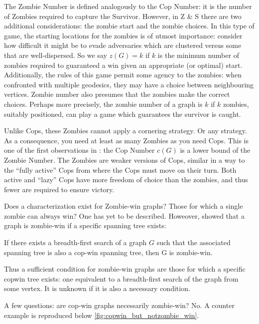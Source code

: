 The Zombie Number is defined analogously to the Cop Number: it is the number of Zombies
required to capture the Survivor. However, in Z \& S there are two additional considerations:
the zombie start and the zombie choices.
In this type of game, the starting locations for the zombies is of utmost importance:
consider how difficult it might be to evade adversaries which are clustered versus some
that are well-dispersed. So we say $z(G) = k$ if $k$ is the minimum number of
zombies required to guaranteed a win
given an appropriate (or optimal) start. Additionally, the rules of this game permit
some agency to the zombies: when confronted with multiple geodesics, they may have
a choice between neighbouring vertices. Zombie number also presumes that
the zombies make the correct choices. Perhaps more precisely, the zombie number of a
graph is $k$ if $k$ zombies, suitably positioned, can play a game which guarantees the survivor
is caught.

Unlike Cops, these Zombies cannot apply a cornering strategy. Or any strategy.
As a consequence, you need at least as many Zombies as you need Cops.
This is one of the first observations
in \cite{fitzpatrick2016deterministic}: the Cop Number $c(G)$ is a lower bound of the Zombie Number. The Zombies are weaker versions of Cops, similar in a way to the ``fully active'' Cops from \cite{gromovikov2018fully} where the Cops must move on their turn. Both
active and ``lazy'' Cops have more freedom of choice than the zombies, and thus
fewer are required to ensure victory.

Does a characterization exist for Zombie-win graphs? Those for which a single zombie
can always win? One has yet to be described. Howeover, \cite{fitzpatrick2016deterministic} showed that a graph is zombie-win if a specific spanning tree exists:

\begin{theorem}[Fitzpatrick] If there exists a breadth-first search of a graph $G$ such that the associated spanning tree is also a cop-win spanning tree, then G is zombie-win.
\end{theorem}

Thus a sufficient condition for zombie-win graphs are those for which a specific copwin tree exists: one equivalent to a breadth-first search of the graph from some vertex. It is unknown if it is also a necessary condition.

A few questions: are cop-win graphs necessarily zombie-win? No. A counter example \cite{fitzpatrick2016deterministic} is reproduced below \ref{fig:copwin_but_notzombie_win}.

